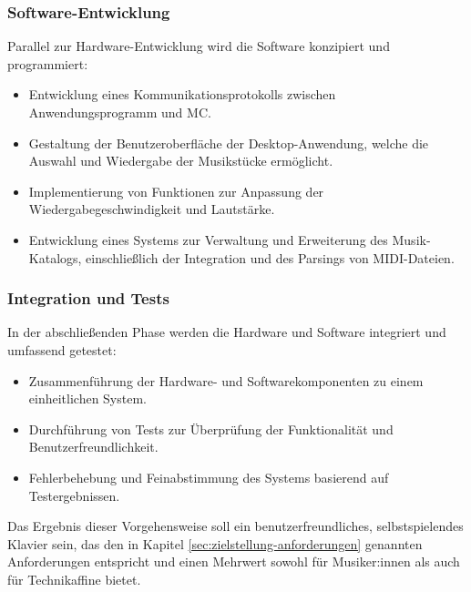 \subsubsection{Software-Entwicklung}\label{Vorgehensweise - Software-Entwicklung}

Parallel zur Hardware-Entwicklung wird die Software konzipiert und programmiert:

\begin{itemize}
    \item Entwicklung eines Kommunikationsprotokolls zwischen Anwendungsprogramm und \ac{MC}.
    \item Gestaltung der Benutzeroberfläche der Desktop-Anwendung, welche die Auswahl und Wiedergabe der Musikstücke ermöglicht.
    \item Implementierung von Funktionen zur Anpassung der Wiedergabegeschwindigkeit und Lautstärke.
    \item Entwicklung eines Systems zur Verwaltung und Erweiterung des Musik-Katalogs, einschließlich der Integration und des Parsings von MIDI-Dateien.
\end{itemize}

\subsubsection{Integration und Tests}\label{Vorgehensweise - Integration und Tests}

In der abschließenden Phase werden die Hardware und Software integriert und umfassend getestet:

\begin{itemize}
    \item Zusammenführung der Hardware- und Softwarekomponenten zu einem einheitlichen System.
    \item Durchführung von Tests zur Überprüfung der Funktionalität und Benutzerfreundlichkeit.
    \item Fehlerbehebung und Feinabstimmung des Systems basierend auf Testergebnissen.
\end{itemize}

Das Ergebnis dieser Vorgehensweise soll ein benutzerfreundliches, selbstspielendes Klavier sein,
das den in Kapitel \ref{sec:zielstellung-anforderungen} genannten Anforderungen entspricht und einen Mehrwert sowohl für Musiker:innen als auch für Technikaffine bietet.
